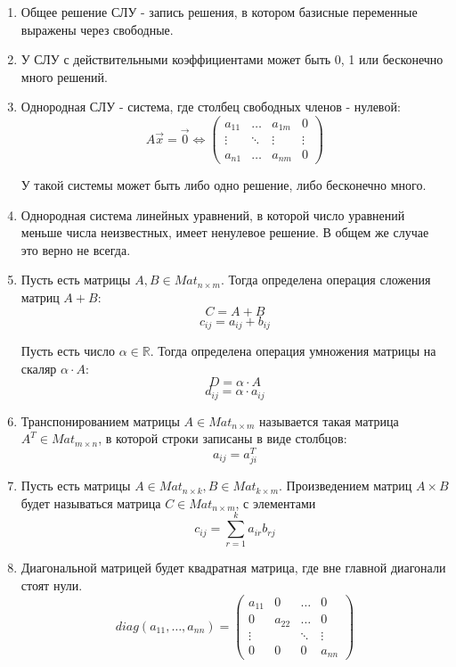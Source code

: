 \documentclass[a4paper,12pt]{article}
\begin{document}
\begin{enumerate}
		\item Общее решение СЛУ - запись решения, в котором базисные переменные выражены через свободные. 
		
		\item У СЛУ с действительными коэффициентами может быть 0, 1 или бесконечно много решений.
		
		\item Однородная СЛУ - система, где столбец свободных членов - нулевой:
		\[
		A\overrightarrow{x} = \overrightarrow{0}
		\Leftrightarrow
		\left(
		\begin{array}{ccc|c}
		a_{11} & \ldots & a_{1m} & 0 \\
		\vdots & \ddots & \vdots & \vdots \\
		a_{n1} & \ldots & a_{nm} & 0
		\end{array}
		\right)
		\]
		
		У такой системы может быть либо одно решение, либо бесконечно много. 
		
		\item Однородная система линейных уравнений, в которой число уравнений меньше числа неизвестных, имеет ненулевое решение. В общем же случае это верно не всегда.
		
		\item Пусть есть матрицы $A, B \in Mat_{n \times m}$. Тогда определена операция сложения матриц $A + B$:
		\[
		C = A + B
		\]
		\[
		c_{ij} = a_{ij} + b_{ij}
		\]
		
		Пусть есть число $\alpha \in \mathbb{R}$. Тогда определена операция умножения матрицы на скаляр $\alpha \cdot A$:
		\[
		D = \alpha \cdot A
		\]
		\[
		d_{ij} = \alpha \cdot a_{ij}
		\]
		
		\item Транспонированием матрицы $A \in Mat_{n \times m}$ называется такая матрица $A^T \in Mat_{m \times n}$, в которой строки записаны в виде столбцов:
		\[
		a_{ij} = a^T_{ji}
		\]
		
		\item Пусть есть матрицы $A \in Mat_{n \times k}, B \in Mat_{k \times m}$. Произведением матриц $A \times B$ будет называться матрица $C \in Mat_{n \times m }$, с элементами 
		\[
		c_{ij} = \sum_{r = 1}^{k}a_{ir}b_{rj}
		\]
		
		\item Диагональной матрицей будет квадратная матрица, где вне главной диагонали стоят нули.
		\[
		diag(a_{11}, \ldots, a_{nn}) = 
		\begin{pmatrix}
		a_{11} & 0 & \ldots & 0\\
		0 & a_{22} & \ldots & 0 \\
		\vdots &  & \ddots & \vdots \\
		0 & 0 & 0 &a_{nn}
		\end{pmatrix}
		\]
		

\end{enumerate}
\end{document}
